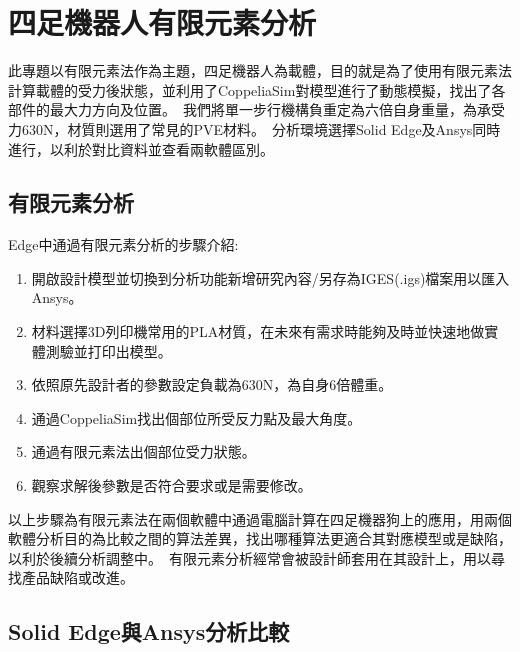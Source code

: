 \chapter{四足機器人有限元素分析}

此專題以有限元素法作為主題，四足機器人為載體，目的就是為了使用有限元素法計算載體的受力後狀態，並利用了CoppeliaSim對模型進行了動態模擬，找出了各部件的最大力方向及位置。\
我們將單一步行機構負重定為六倍自身重量，為承受力630N，材質則選用了常見的PVE材料。\
分析環境選擇Solid Edge及Ansys同時進行，以利於對比資料並查看兩軟體區別。\\

\section{有限元素分析}
\begin{itemize}
 Edge中通過有限元素分析的步驟介紹:
  \begin{enumerate}
  \item 開啟設計模型並切換到分析功能新增研究內容/另存為IGES(.igs)檔案用以匯入Ansys。
  \item 材料選擇3D列印機常用的PLA材質，在未來有需求時能夠及時並快速地做實體測驗並打印出模型。
  \item 依照原先設計者的參數設定負載為630N，為自身6倍體重。
  \item 通過CoppeliaSim找出個部位所受反力點及最大角度。
  \item 通過有限元素法出個部位受力狀態。
  \item 觀察求解後參數是否符合要求或是需要修改。
  \end {enumerate}
\end{itemize}
以上步驟為有限元素法在兩個軟體中通過電腦計算在四足機器狗上的應用，用兩個軟體分析目的為比較之間的算法差異，找出哪種算法更適合其對應模型或是缺陷，以利於後續分析調整中。\
有限元素分析經常會被設計師套用在其設計上，用以尋找產品缺陷或改進。\
\newpage
\section{Solid Edge與Ansys分析比較}

\newpage
